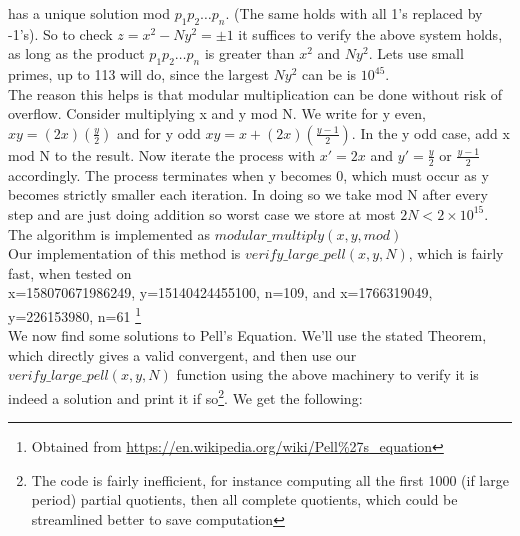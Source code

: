 \documentclass[10pt,a4paper]{report}
\begin{document}
has a unique solution mod $p_1p_2\dots p_n$. (The same holds with all 1's replaced by -1's). So to check $z=x^2-Ny^2= \pm 1$ it suffices to verify the above system holds, as long as the product $p_1p_2\dots p_n$ is greater than $x^2$ and $Ny^2$. Lets use small primes, up to 113 will do, since the largest $Ny^2$ can be is $10^{45}$. \\

The reason this helps is that modular multiplication can be done without risk of overflow. Consider multiplying x and y mod N. We write for y even, $xy = (2x)(\frac{y}{2})$ and for y odd $xy = x+ (2x)(\frac{y-1}{2})$. In the y odd case, add x mod N to the result. Now iterate the process with $x'=2x$ and $y'=\frac{y}{2}$ or $\frac{y-1}{2}$ accordingly. The process terminates when y becomes 0, which must occur as y becomes strictly smaller each iteration. In doing so we take mod N after every step and are just doing addition so worst case we store at most $2N < 2\times10^{15}$. The algorithm is implemented as $modular\_multiply(x,y,mod)$\\

Our implementation of this method is $verify\_large\_pell(x,y,N)$, which is fairly fast, when tested on \\ x=158070671986249, y=15140424455100, n=109, and x=1766319049, y=226153980, n=61 \footnote{Obtained from \url{https://en.wikipedia.org/wiki/Pell\%27s_equation}}\\	

We now find some solutions to Pell's Equation. We'll use the stated Theorem, which directly gives a valid convergent, and then use our $verify\_large\_pell(x,y,N)$ function using the above machinery to verify it is indeed a solution and print it if so\footnote{The code is fairly inefficient, for instance computing all the first 1000 (if large period) partial quotients, then all complete quotients, which could be streamlined better to save computation}. We get the following:
\end{document}
